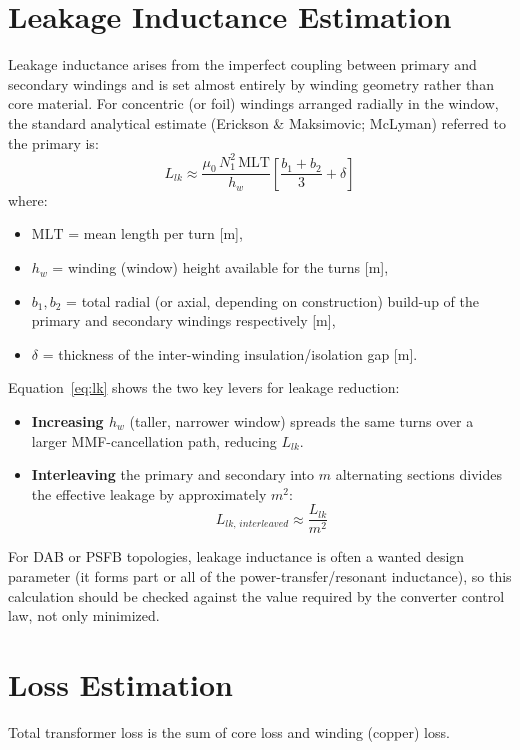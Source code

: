 \documentclass[11pt,a4paper]{article}
\begin{document}
\section{Leakage Inductance Estimation}
Leakage inductance arises from the imperfect coupling between primary and
secondary windings and is set almost entirely by winding geometry rather than
core material. For concentric (or foil) windings arranged radially in the
window, the standard analytical estimate (Erickson \& Maksimovic;
McLyman)\cite{erickson,mclyman} referred to the primary is:
\begin{equation}
    L_{lk} \approx \frac{\mu_0 \, N_1^2 \, \mathrm{MLT}}{h_w}
    \left[ \frac{b_1+b_2}{3} + \delta \right]
    \label{eq:lk}
\end{equation}
where:
\begin{itemize}
    \item $\mathrm{MLT}$ = mean length per turn [m],
    \item $h_w$ = winding (window) height available for the turns [m],
    \item $b_1, b_2$ = total radial (or axial, depending on construction)
    build-up of the primary and secondary windings respectively [m],
    \item $\delta$ = thickness of the inter-winding insulation/isolation gap [m].
\end{itemize}
Equation~\eqref{eq:lk} shows the two key levers for leakage reduction:
\begin{itemize}
    \item \textbf{Increasing $h_w$} (taller, narrower window) spreads the same
    turns over a larger MMF-cancellation path, reducing $L_{lk}$.
    \item \textbf{Interleaving} the primary and secondary into $m$ alternating
    sections divides the effective leakage by approximately $m^2$:
    \begin{equation}
        L_{lk,\,interleaved} \approx \frac{L_{lk}}{m^2}
    \end{equation}
\end{itemize}
For DAB or PSFB topologies, leakage inductance is often a wanted design
parameter (it forms part or all of the power-transfer/resonant inductance), so
this calculation should be checked against the value required by the converter
control law, not only minimized.

\section{Loss Estimation}
Total transformer loss is the sum of core loss and winding (copper) loss.
\end{document}
